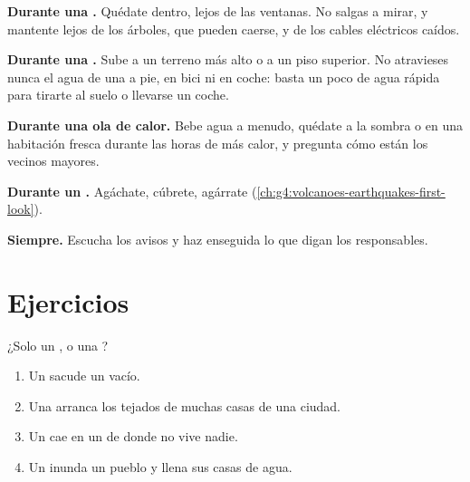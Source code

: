 \begin{safety}
\textbf{Durante una .} Quédate dentro, lejos de las ventanas. No
salgas a mirar, y mantente lejos de los árboles, que pueden caerse, y de los
cables eléctricos caídos.

\textbf{Durante una .} Sube a un terreno más alto o a un piso
superior. No atravieses nunca el agua de una  a pie, en bici ni en
coche: basta un poco de agua rápida para tirarte al suelo o llevarse un
coche.

\textbf{Durante una ola de calor.} Bebe agua a menudo, quédate a la sombra o
en una habitación fresca durante las horas de más calor, y pregunta cómo
están los vecinos mayores.

\textbf{Durante un .} Agáchate, cúbrete, agárrate
(\cref{ch:g4:volcanoes-earthquakes-first-look}).

\textbf{Siempre.} Escucha los avisos y haz enseguida lo que digan los
responsables.
\end{safety}

\section{Ejercicios}

\begin{exercise}[$\star$]\label{exo:g5:natural-hazards:1}
¿Solo un , o una ?
\begin{enumerate}
  \item[(a)] Un  sacude un  vacío.
  \item[(b)] Una  arranca los tejados de muchas casas de una ciudad.
  \item[(c)] Un  cae en un  de  donde no
        vive nadie.
  \item[(d)] Un  inunda un pueblo y llena sus casas de agua.
\end{enumerate}
\end{exercise}


